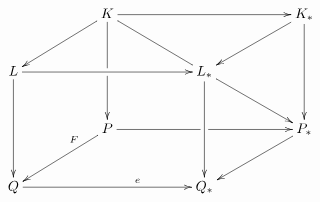 \documentclass[english,11pt]{article}
\begin{document}
\title{}
\author{}
\date{}
\maketitle

$$
\xymatrix@R+1mm@C+1cm{
&K\ar[rr]\ar@{->}[dl]\ar[dd]|!{[d];[d]}\hole\ar@{-}[dr]&&K_{*}\ar[dl]\ar[dd]\\
L\ar@{->}[rr]\ar@{->}[dd]&&L_{*}\ar[dd]\ar[dr]\\
&P\ar@{->}[rr]|!{[r];[r]}\hole\ar@{->}[dl]_(0.3){F}&&P_{*}\ar[dl]\\
Q\ar^(.65){e}[rr]&&Q_{*}
}
$$
\end{document}
